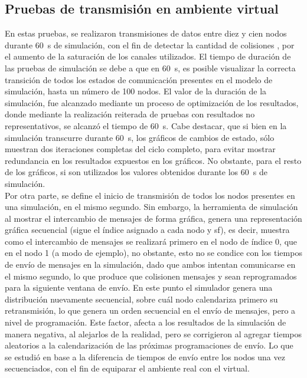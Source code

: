 \begin{justify}
\subsection{Pruebas de transmisión en ambiente virtual}
En estas pruebas, se realizaron transmisiones de datos entre diez y cien nodos durante \SI{60}{\second} de simulación, con el fin de detectar la cantidad de colisiones , por el aumento de la saturación de los canales utilizados. El tiempo de duración de las pruebas de simulación se debe a que en \SI{60}{\second}, es posible visualizar la correcta transición de todos los estados de comunicación presentes en el modelo de simulación, hasta un número de 100 nodos. El valor de la duración de la simulación, fue alcanzado mediante un proceso de optimización de los resultados, donde mediante la realización reiterada de pruebas con resultados no representativos, se alcanzó el tiempo de \SI{60}{\second}. Cabe destacar, que si bien en la simulación transcurre durante \SI{60}{\second}, los gráficos de cambios de estado, sólo muestran dos iteraciones completas del ciclo completo, para evitar mostrar redundancia en los resultados expuestos en los gráficos. No obstante, para el resto de los gráficos, si son utilizados los valores obtenidos durante los \SI{60}{\second} de simulación.\\
Por otra parte, se define el inicio de transmisión de todos los nodos presentes en una simulación, en el mismo segundo. Sin embargo, la herramienta de simulación al mostrar el intercambio de mensajes de forma gráfica, genera una representación gráfica secuencial (sigue el índice asignado a cada nodo y \gls{sf}), es decir, muestra como el intercambio de mensajes se realizará primero en el nodo de índice 0, que en el nodo 1 (a modo de ejemplo), no obstante, esto no se condice con los tiempos de envío de mensajes en la simulación, dado que ambos intentan comunicarse en el mismo segundo, lo que produce que colisionen mensajes y sean reprogramados para la siguiente ventana de envío. En este punto el simulador genera una distribución nuevamente secuencial, sobre cuál nodo calendariza primero su retransmisión, lo que genera un orden secuencial en el envío de mensajes, pero a nivel de programación. Este factor, afecta a los resultados de la simulación de manera negativa, al alejarlos de la realidad, pero se corrigieron al agregar tiempos aleatorios a la calendarización de las próximas programaciones de envío. Lo que se estudió en base a la diferencia de tiempos de envío entre los nodos una vez secuenciados, con el fin de equiparar el ambiente real con el virtual.\\

\end{justify}
